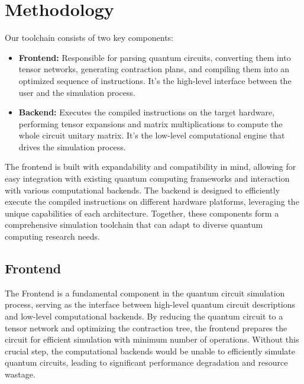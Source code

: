\documentclass[12pt,oneside,a4paper]{article}
\begin{document}

\section{Methodology}
\label{sec:methodology}

Our toolchain consists of two key components:

\begin{itemize}
    \item \textbf{Frontend:} Responsible for parsing quantum circuits, converting them into tensor networks, generating contraction plans, and compiling them into an optimized sequence of instructions. It's the high-level interface between the user and the simulation process.
    \item \textbf{Backend:} Executes the compiled instructions on the target hardware, performing tensor expansions and matrix multiplications to compute the whole circuit unitary matrix. It's the low-level computational engine that drives the simulation process.
\end{itemize}

The frontend is built with expandability and compatibility in mind, allowing for easy integration with existing quantum computing frameworks and interaction with various computational backends. The backend is designed to efficiently execute the compiled instructions on different hardware platforms, leveraging the unique capabilities of each architecture. Together, these components form a comprehensive simulation toolchain that can adapt to diverse quantum computing research needs.

\subsection{Frontend}

The Frontend is a fundamental component in the quantum circuit simulation process, serving as the interface between high-level quantum circuit descriptions and low-level computational backends. By reducing the quantum circuit to a tensor network and optimizing the contraction tree, the frontend prepares the circuit for efficient simulation with minimum number of operations. Without this crucial step, the computational backends would be unable to efficiently simulate quantum circuits, leading to significant performance degradation and resource wastage.
\end{document}
